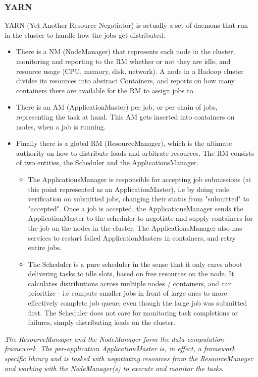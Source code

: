 \documentclass[a4paper,english]{report}
\begin{document}
		\subsubsection{YARN}
		YARN (Yet Another Resource Negotiator) is actually a set of daemons that run in the cluster to handle how the jobs get distributed. 
		\begin{itemize}
			\item There is a NM (NodeManager) that represents each node in the cluster, monitoring and reporting to the RM whether or not they are idle, and resource usage (CPU, memory, disk, network). A node in a Hadoop cluster divides its resources into abstract Containers, and reports on how many containers there are available for the RM to assign jobs to.
			\item There is an AM (ApplicationMaster) per job, or per chain of jobs, representing the task at hand. This AM gets inserted into containers on nodes, when a job is running.
			\item Finally there is a global RM (ResourceManager), which is the ultimate authority on how to distribute loads and arbitrate resources. The RM consists of two entities, the Scheduler and the ApplicationsManager.
			\begin{itemize}	
				\item The ApplicationsManager is responsible for accepting job submissions (at this point represented as an ApplicationMaster), i.e by doing code verification on submitted jobs, changing their status from "submitted" to "accepted". Once a job is accepted, the ApplicationsManager sends the ApplicationMaster to the scheduler to negotiate and supply containers for the job on the nodes in the cluster. The ApplicationsManager also has services to restart failed ApplicationMasters in containers, and retry entire jobs.
				\item The Scheduler is a pure scheduler in the sense that it only cares about delivering tasks to idle slots, based on free resources on the node. It calculates distributions across multiple nodes / containers, and can prioritize - i.e compute smaller jobs in front of large ones to more effectively complete job queue, even though the large job was submitted first. The Scheduler does not care for monitoring task completions or failures, simply distributing loads on the cluster.
			\end{itemize}
		\end{itemize}
		\textit{The ResourceManager and the NodeManager form the data-computation framework. The per-application ApplicationMaster is, in effect, a framework specific library and is tasked with negotiating resources from the ResourceManager and working with the NodeManager(s) to execute and monitor the tasks}\cite{yarn}.
		
\end{document}
